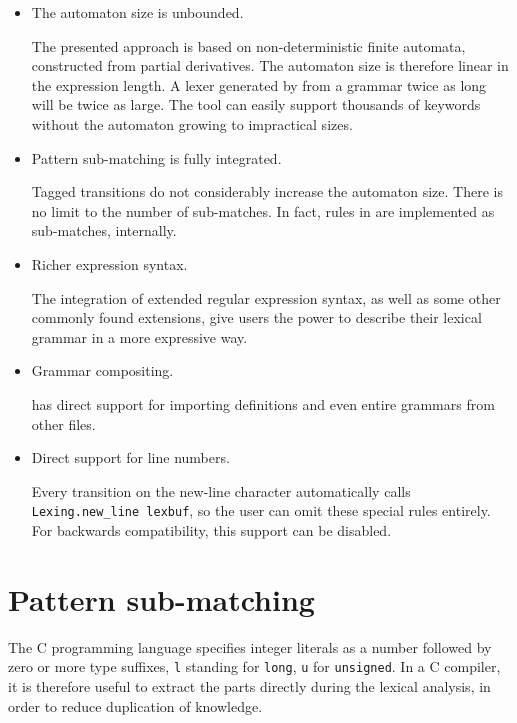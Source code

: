 \begin{itemize}

   \item The automaton size is unbounded.

      The presented approach is based on non-deterministic finite automata,
      constructed from partial derivatives. The automaton size is therefore
      linear in the expression length. A lexer generated by \reml{} from a
      grammar twice as long will be twice as large. The tool can easily support
      thousands of keywords without the automaton growing to impractical sizes.

   \item Pattern sub-matching is fully integrated.

      Tagged transitions do not considerably increase the automaton size. There
      is no limit to the number of sub-matches. In fact, rules in \reml{} are
      implemented as sub-matches, internally.

   \item Richer expression syntax.

      The integration of extended regular expression syntax, as well as some
      other commonly found extensions, give \reml{} users the power to describe
      their lexical grammar in a more expressive way.

   \item Grammar compositing.

      \reml{} has direct support for importing definitions and even entire
      grammars from other files.

   \item Direct support for line numbers.

      Every transition on the new-line character automatically calls
      \texttt{Lexing.new\_line lexbuf}, so the user can omit these special rules
      entirely. For backwards compatibility, this support can be disabled.

\end{itemize}


\section{Pattern sub-matching}

The C programming language specifies integer literals as a number followed by
zero or more type suffixes, \texttt{l} standing for \texttt{long}, \texttt{u}
for \texttt{unsigned}. In a C compiler, it is therefore useful to extract the
parts directly during the lexical analysis, in order to reduce duplication of
knowledge.

